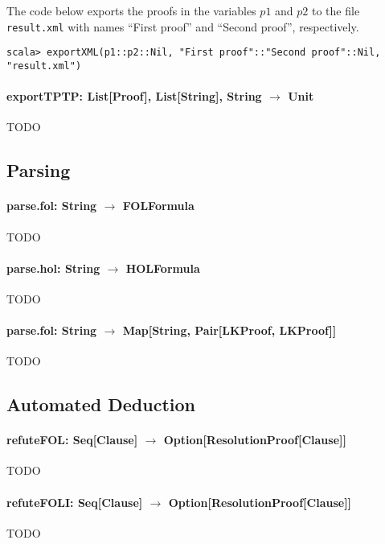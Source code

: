 \documentclass[a4paper, 11pt]{report}
\begin{document}
The code below exports the proofs in the variables $p1$ and $p2$ to the file
\texttt{result.xml} with names ``First proof'' and ``Second proof'',
respectively.
\begin{lstlisting}
scala> exportXML(p1::p2::Nil, "First proof"::"Second proof"::Nil, "result.xml")
\end{lstlisting}

\paragraph{\textbf{exportTPTP: List[Proof], List[String], String $\rightarrow$ Unit}}
{\color{red}TODO}

\subsection{Parsing}

\paragraph{\textbf{parse.fol: String $\rightarrow$ FOLFormula}}
{\color{red}TODO}

\paragraph{\textbf{parse.hol: String $\rightarrow$ HOLFormula}}
{\color{red}TODO}

\paragraph{\textbf{parse.fol: String $\rightarrow$ Map[String, Pair[LKProof, LKProof]]}}
{\color{red}TODO}

\subsection{Automated Deduction}
  
\paragraph{\textbf{refuteFOL: Seq[Clause] $\rightarrow$ Option[ResolutionProof[Clause]]}}
{\color{red}TODO}

\paragraph{\textbf{refuteFOLI: Seq[Clause] $\rightarrow$ Option[ResolutionProof[Clause]]}}
{\color{red}TODO}
\end{document}
